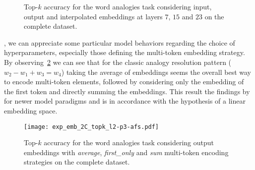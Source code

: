 \begin{figure}[t!]
    \centering
    \caption[Top-$k$ accuracy for the word analogies task considering input, output and interpolated embeddings on the complete dataset.]{Top-$k$ accuracy for the word analogies task considering input, output and interpolated embeddings at layers $7$, $15$ and $23$ on the complete dataset.}
    \label{fig:exp_emb_2_B}
\end{figure}

, we can appreciate some particular model behaviors regarding the choice of hyperparameters, especially those defining the multi-token embedding strategy.
By observing~\cref{fig:exp_emb_2_C} we can see that for the classic analogy resolution pattern ($w_2 - w_1 + w_3 = w_4$) taking the average of embeddings seems the overall best way to encode multi-token elements, followed by considering only the embedding of the first token and directly summing the embeddings.
This result  the findings  by~\citet{drozd2016} for newer model paradigms and is in accordance with the hypothesis of a linear embedding space.

\begin{figure}[t!]
    \centering
    \texttt{[image: exp\_emb\_2C\_topk\_l2-p3-afs.pdf]}
    \caption[Top-$k$ accuracy for the word analogies task considering output embeddings with different multi-token encoding strategies on the complete dataset.]{Top-$k$ accuracy for the word analogies task considering output embeddings with \emph{average}, \emph{first\_only} and \emph{sum} multi-token encoding strategies on the complete dataset.}
    \label{fig:exp_emb_2_C}
\end{figure}

